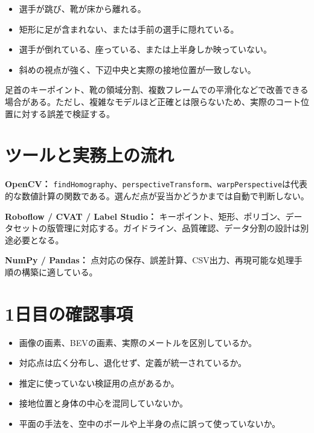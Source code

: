 \documentclass[11pt,a4paper,oneside]{report}
\begin{document}
\begin{itemize}
  \item 選手が跳び、靴が床から離れる。
  \item 矩形に足が含まれない、または手前の選手に隠れている。
  \item 選手が倒れている、座っている、または上半身しか映っていない。
  \item 斜めの視点が強く、下辺中央と実際の接地位置が一致しない。
\end{itemize}

足首のキーポイント、靴の領域分割、複数フレームでの平滑化などで改善できる場合がある。ただし、複雑なモデルほど正確とは限らないため、実際のコート位置に対する誤差で検証する。


\section{ツールと実務上の流れ}


\begin{toolBox}
\textbf{OpenCV：}\quad
\texttt{findHomography}、\texttt{perspectiveTransform}、\texttt{warpPerspective}は代表的な数値計算の関数である。選んだ点が妥当かどうかまでは自動で判断しない。

\textbf{Roboflow / CVAT / Label Studio：}\quad
キーポイント、矩形、ポリゴン、データセットの版管理に対応する。ガイドライン、品質確認、データ分割の設計は別途必要となる。

\textbf{NumPy / Pandas：}\quad
点対応の保存、誤差計算、CSV出力、再現可能な処理手順の構築に適している。
\end{toolBox}

\section{1日目の確認事項}

\begin{takeawayBox}
\begin{itemize}
  \item 画像の画素、BEVの画素、実際のメートルを区別しているか。
  \item 対応点は広く分布し、退化せず、定義が統一されているか。
  \item 推定に使っていない検証用の点があるか。
  \item 接地位置と身体の中心を混同していないか。
  \item 平面の手法を、空中のボールや上半身の点に誤って使っていないか。
\end{itemize}
\end{takeawayBox}
\end{document}
